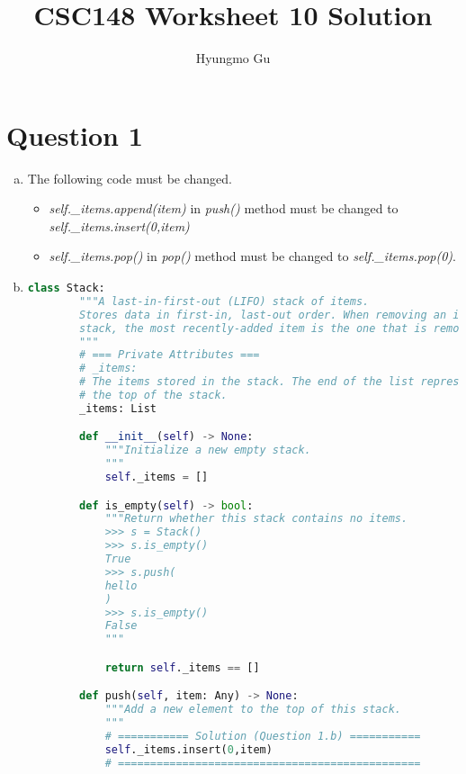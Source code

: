\documentclass[12pt]{article}
\begin{document}
\title{CSC148 Worksheet 10 Solution}
\author{Hyungmo Gu}
\maketitle

\section*{Question 1}
\begin{enumerate}[a.]
    \item

    The following code must be changed.

    \begin{itemize}
        \item \textit{self.\_items.append(item)} in \textit{push()} method must
        be changed to \textit{self.\_items.insert(0,item)}
        \item \textit{self.\_items.pop()} in \textit{pop()} method must be changed
        to \textit{self.\_items.pop(0)}.
    \end{itemize}

    \item

    \begin{lstlisting}[language=Python,caption={worksheet\_10\_q1b\_solution.py},captionpos=b]
    class Stack:
        """A last-in-first-out (LIFO) stack of items.
        Stores data in first-in, last-out order. When removing an item from the
        stack, the most recently-added item is the one that is removed.
        """
        # === Private Attributes ===
        # _items:
        # The items stored in the stack. The end of the list represents
        # the top of the stack.
        _items: List

        def __init__(self) -> None:
            """Initialize a new empty stack.
            """
            self._items = []

        def is_empty(self) -> bool:
            """Return whether this stack contains no items.
            >>> s = Stack()
            >>> s.is_empty()
            True
            >>> s.push(
            hello
            )
            >>> s.is_empty()
            False
            """

            return self._items == []

        def push(self, item: Any) -> None:
            """Add a new element to the top of this stack.
            """
            # =========== Solution (Question 1.b) ===========
            self._items.insert(0,item)
            # ===============================================


\end{lstlisting}
\end{enumerate}
\end{document}
